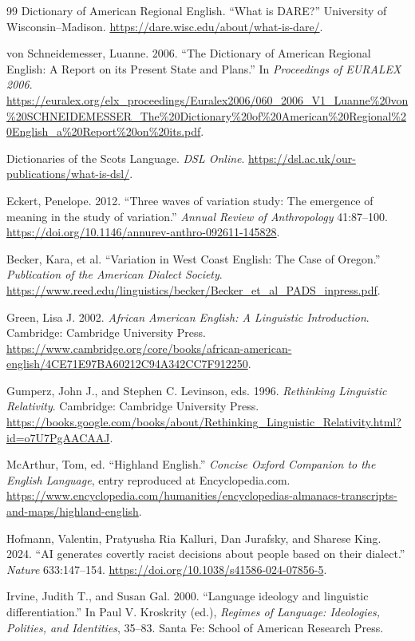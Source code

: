 \documentclass[11pt]{article}
\begin{document}
\begin{thebibliography}{99}
Dictionary of American Regional English.
``What is DARE?''
University of Wisconsin--Madison.
\url{https://dare.wisc.edu/about/what-is-dare/}.

von Schneidemesser, Luanne. 2006.
``The Dictionary of American Regional English: A Report on its Present State
and Plans.''
In \emph{Proceedings of EURALEX 2006}.
\url{https://euralex.org/elx_proceedings/Euralex2006/060_2006_V1_Luanne%20von%20SCHNEIDEMESSER_The%20Dictionary%20of%20American%20Regional%20English_a%20Report%20on%20its.pdf}.

Dictionaries of the Scots Language.
\emph{DSL Online}.
\url{https://dsl.ac.uk/our-publications/what-is-dsl/}.

Eckert, Penelope. 2012.
``Three waves of variation study: The emergence of meaning in the study of
variation.''
\emph{Annual Review of Anthropology} 41:87--100.
\url{https://doi.org/10.1146/annurev-anthro-092611-145828}.

Becker, Kara, et al.
``Variation in West Coast English: The Case of Oregon.''
\emph{Publication of the American Dialect Society}.
\url{https://www.reed.edu/linguistics/becker/Becker_et_al_PADS_inpress.pdf}.

Green, Lisa J. 2002.
\emph{African American English: A Linguistic Introduction}.
Cambridge: Cambridge University Press.
\url{https://www.cambridge.org/core/books/african-american-english/4CE71E97BA60212C94A342CC7F912250}.

Gumperz, John J., and Stephen C. Levinson, eds. 1996.
\emph{Rethinking Linguistic Relativity}.
Cambridge: Cambridge University Press.
\url{https://books.google.com/books/about/Rethinking_Linguistic_Relativity.html?id=o7U7PgAACAAJ}.

McArthur, Tom, ed.
``Highland English.''
\emph{Concise Oxford Companion to the English Language}, entry reproduced at
Encyclopedia.com.
\url{https://www.encyclopedia.com/humanities/encyclopedias-almanacs-transcripts-and-maps/highland-english}.

Hofmann, Valentin, Pratyusha Ria Kalluri, Dan Jurafsky, and Sharese King. 2024.
``AI generates covertly racist decisions about people based on their dialect.''
\emph{Nature} 633:147--154.
\url{https://doi.org/10.1038/s41586-024-07856-5}.

Irvine, Judith T., and Susan Gal. 2000.
``Language ideology and linguistic differentiation.''
In Paul V. Kroskrity (ed.), \emph{Regimes of Language: Ideologies, Polities,
and Identities}, 35--83.
Santa Fe: School of American Research Press.


\end{thebibliography}
\end{document}
